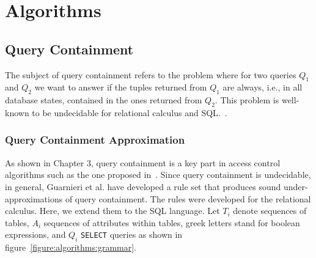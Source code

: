 \section{Algorithms}


\subsection{Query Containment}


The subject of query containment refers to the problem where for two queries $Q_1$ and $Q_2$ we want to answer if the tuples returned from $Q_1$ are always, i.e., in all database states, contained in the ones returned from $Q_2$.
%
This problem is well-known to be undecidable for relational calculus and SQL.~\cite{abiteboul1995foundations}.
%

\subsubsection{Query Containment Approximation}

As shown in Chapter 3, query containment is a key part in access control algorithms such as the one proposed in~\cite{guarnieri2016strong}.
Since query containment is undecidable, in general, Guarnieri et al. have developed a rule set that produces sound under-approximations of query containment.
%
The rules were developed for the relational calculus.
%
Here, we extend them to the SQL language.
%
Let $T_i$ denote sequences of tables, $A_i$ sequences of attributes within tables, greek letters stand for boolean expressions, and $Q_i$ \texttt{SELECT} queries as shown in figure~\ref{figure:algorithms:grammar}.


